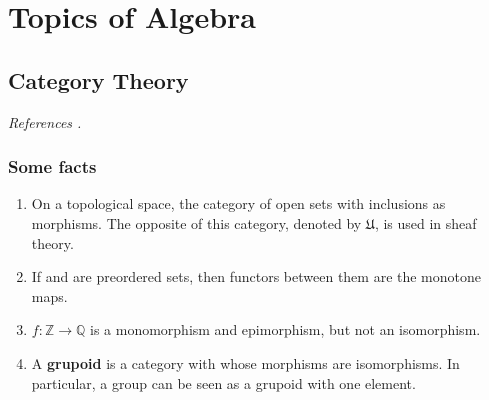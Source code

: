\part{Topics of Algebra}


\chapter{Category Theory}

\textit{References \cite{adamekAbstractConcreteCategories2004,richterCategoriesHomotopyTheory2020}.} %


\section{Some facts}  

\begin{example}
    \begin{enumerate}
        \item On a topological space, the category of open sets with inclusions as morphisms. The opposite of this category, denoted by $\mathfrak{U}$, is used in sheaf theory.
        \item If \ca and \cb are preordered sets, then functors between them are the monotone maps.
        \item $f: \mathbb{Z} \rightarrow \mathbb{Q}$ is a monomorphism and epimorphism, but not an isomorphism.
        \item A \textbf{grupoid} is a category with whose morphisms are isomorphisms. In particular, a group can be seen as a grupoid with one element.
    \end{enumerate}
\end{example}
\medspace


